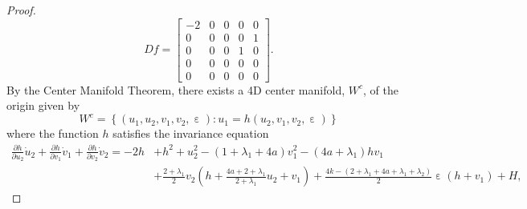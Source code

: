 \documentclass[10pt,onecolumn]{article}
\theoremstyle{plain}
\DeclareMathOperator{\eps}{\varepsilon}
\begin{document}
\begin{proof}
\[ Df = \begin{bmatrix} -2 & 0 & 0 & 0 & 0 \\ 0 & 0 & 0 & 0 & 1 \\ 0 & 0 & 0 & 1 & 0 \\ 0 & 0 & 0 & 0 & 0 \\ 0 & 0 & 0 & 0 & 0 \end{bmatrix}. \]
%
By the Center Manifold Theorem, there exists a 4D center manifold, $W^c$, of the origin given by 
%
\[ W^c = \left\{ (u_1,u_2,v_1,v_2,\eps) : u_1 = h(u_2,v_1,v_2,\eps) \right\} \]
%
where the function $h$ satisfies the invariance equation 
%
\begin{equation*} 
  \begin{split}
\tfrac{\partial h}{\partial u_2} \dot u_2 + \tfrac{\partial h}{\partial v_1} \dot v_1 + \tfrac{\partial h}{\partial v_2} \dot v_2 = -2h &+ h^2+u_2^2-(1+\lambda_1+4a)v_1^2-(4a+\lambda_1) h v_1  \\ 
& + \tfrac{2+\lambda_1}{2} v_2 \left( h+\tfrac{4a+2+\lambda_1}{2+\lambda_1}u_2 + v_1 \right) + \tfrac{4k-(2+\lambda_1+4a+\lambda_1+\lambda_2)}{2} \eps (h+v_1) + H,

\end{split}
\end{equation*}
\end{proof}
\end{document}
